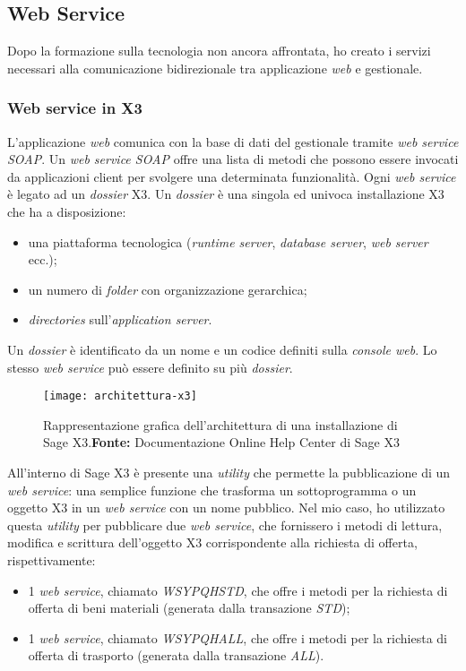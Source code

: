 
\subsection{Web Service}
Dopo la formazione sulla tecnologia non ancora affrontata, ho creato i servizi
necessari alla comunicazione bidirezionale tra applicazione \textit{web} e gestionale.

\subsubsection{Web service in X3}
L'applicazione \textit{web} comunica con la base di dati del gestionale tramite \textit{web service SOAP}.
Un \textit{web service SOAP} offre una lista di metodi che possono essere invocati da applicazioni client per svolgere una determinata funzionalità.
Ogni \textit{web service} è legato ad un \textit{dossier} X3. Un \textit{dossier} è una singola ed univoca installazione X3 che ha a disposizione:
\begin{itemize}
	\item una piattaforma tecnologica (\textit{runtime server}, \textit{database server}, \textit{web server} ecc.);
	\item un numero di \textit{folder} con organizzazione gerarchica;
	\item \textit{directories} sull'\textit{application server}.
\end{itemize}
Un \textit{dossier} è identificato da un nome e un codice definiti sulla \textit{console web}.
Lo stesso \textit{web service} può essere definito su più \textit{dossier}.


\begin{figure}[htbp]
	\begin{center}
		\texttt{[image: architettura-x3]}
		\caption{Rappresentazione grafica dell'architettura di una installazione di Sage X3.\newline \textbf{Fonte:} Documentazione Online Help Center di Sage X3}
	\end{center}
\end{figure}


All'interno di Sage X3 è presente una \textit{utility} che permette la pubblicazione di un \textit{web service}: una semplice funzione che trasforma un sottoprogramma o un oggetto X3 in un \textit{web service} con un nome pubblico.
Nel mio caso, ho utilizzato questa \textit{utility} per pubblicare due \textit{web service}, che fornissero i metodi di lettura, modifica e scrittura dell'oggetto X3 corrispondente alla richiesta di offerta, rispettivamente:
\begin{itemize}
	\item 1 \textit{web service}, chiamato \textit{WSYPQHSTD}, che offre i metodi per la richiesta di offerta di beni materiali (generata dalla transazione \textit{STD}); 
	\item 1 \textit{web service}, chiamato \textit{WSYPQHALL}, che offre i metodi per la richiesta di offerta di trasporto (generata dalla transazione \textit{ALL}).
\end{itemize}



